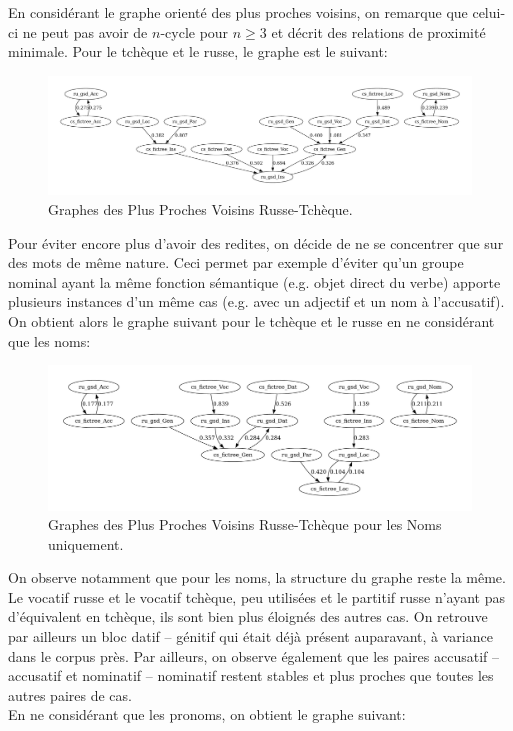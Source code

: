 \documentclass{cours}
\begin{document}
En considérant le graphe orienté des plus proches voisins, on remarque que celui-ci ne peut pas avoir de $n$-cycle pour $n \geq 3$ et décrit des relations de proximité minimale.
Pour le tchèque et le russe, le graphe est le suivant:

\begin{figure}[H]
	\centering
	\includegraphics[width=\textwidth]{Figures/GNN/gnn_ru_gsd_cs_fictree}
	\caption{Graphes des Plus Proches Voisins Russe-Tchèque.}
\end{figure}

Pour éviter encore plus d'avoir des redites, on décide de ne se concentrer que sur des mots de même nature.
Ceci permet par exemple d'éviter qu'un groupe nominal ayant la même fonction sémantique (e.g. objet direct du verbe) apporte plusieurs instances d'un même cas (e.g. avec un adjectif et un nom à l'accusatif).
On obtient alors le graphe suivant pour le tchèque et le russe en ne considérant que les noms:

\begin{figure}[H]
	\centering
	\includegraphics[width=\textwidth]{Figures/GNN/gnn_ru_gsd_cs_fictree_Nouns_Only}
	\caption{Graphes des Plus Proches Voisins Russe-Tchèque pour les Noms uniquement.}
\end{figure}

On observe notamment que pour les noms, la structure du graphe reste la même.
Le vocatif russe et le vocatif tchèque, peu utilisées et le partitif russe n'ayant pas d'équivalent en tchèque, ils sont bien plus éloignés des autres cas.
On retrouve par ailleurs un bloc datif -- génitif qui était déjà présent auparavant, à variance dans le corpus près.
Par ailleurs, on observe également que les paires accusatif -- accusatif et nominatif -- nominatif restent stables et plus proches que toutes les autres paires de cas.\\
En ne considérant que les pronoms, on obtient le graphe suivant:
\end{document}
